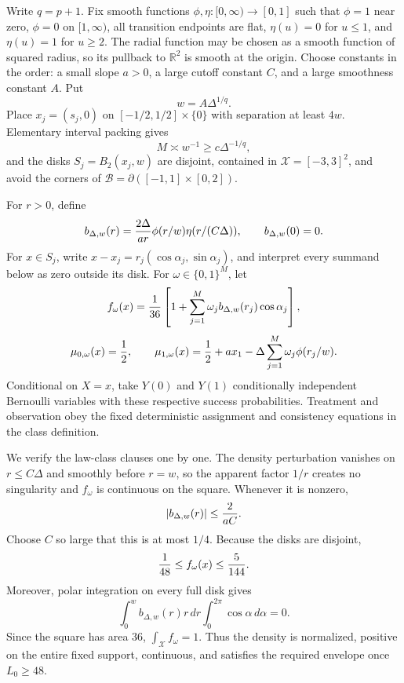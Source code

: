 Write \(q=p+1\).  Fix smooth functions \(\phi,\eta:[0,\infty)\to[0,1]\) such that \(\phi=1\) near zero, \(\phi=0\) on \([1,\infty)\), all transition endpoints are flat, \(\eta(u)=0\) for \(u\leq1\), and \(\eta(u)=1\) for \(u\geq2\).  The radial function may be chosen as a smooth function of squared radius, so its pullback to \(\mathbb R^2\) is smooth at the origin.  Choose constants in the order: a small slope \(a>0\), a large cutoff constant \(C\), and a large smoothness constant \(A\).  Put
\[
 w=A\Delta^{1/q}.
\]
Place \(x_j=(s_j,0)\) on \([-1/2,1/2]\times\{0\}\) with separation at least \(4w\).  Elementary interval packing gives
\[
 M\asymp w^{-1}\geq c\Delta^{-1/q},
\]
and the disks \(S_j=B_2(x_j,w)\) are disjoint, contained in \(\mathcal X=[-3,3]^2\), and avoid the corners of \(\mathcal B=\partial([-1,1]\times[0,2])\).

For \(r>0\), define
\[
 b_{\Delta,w}(r)={2\Delta\over ar}\phi(r/w)\eta(r/(C\Delta)),
 \qquad b_{\Delta,w}(0)=0.
\]
For \(x\in S_j\), write \(x-x_j=r_j(\cos\alpha_j,\sin\alpha_j)\), and interpret every summand below as zero outside its disk.  For \(\omega\in\{0,1\}^M\), let
\[
 f_\omega(x)={1\over36}\left[1+\sum_{j=1}^M\omega_jb_{\Delta,w}(r_j)\cos\alpha_j\right],
\]
\[
 \mu_{0,\omega}(x)={1\over2},
 \qquad
 \mu_{1,\omega}(x)={1\over2}+ax_1-\Delta\sum_{j=1}^M\omega_j\phi(r_j/w).
\]
Conditional on \(X=x\), take \(Y(0)\) and \(Y(1)\) conditionally independent Bernoulli variables with these respective success probabilities.  Treatment and observation obey the fixed deterministic assignment and consistency equations in the class definition.

We verify the law-class clauses one by one.  The density perturbation vanishes on \(r\leq C\Delta\) and smoothly before \(r=w\), so the apparent factor \(1/r\) creates no singularity and \(f_\omega\) is continuous on the square.  Whenever it is nonzero,
\[
 |b_{\Delta,w}(r)|\leq {2\over aC}.
\]
Choose \(C\) so large that this is at most \(1/4\).  Because the disks are disjoint,
\[
 {1\over48}\leq f_\omega(x)\leq {5\over144}.
\]
Moreover, polar integration on every full disk gives
\[
 \int_0^w b_{\Delta,w}(r)r\,dr\int_0^{2\pi}\cos\alpha\,d\alpha=0.
\]
Since the square has area \(36\), \(\int_{\mathcal X}f_\omega=1\).  Thus the density is normalized, positive on the entire fixed support, continuous, and satisfies the required envelope once \(L_0\geq48\).

